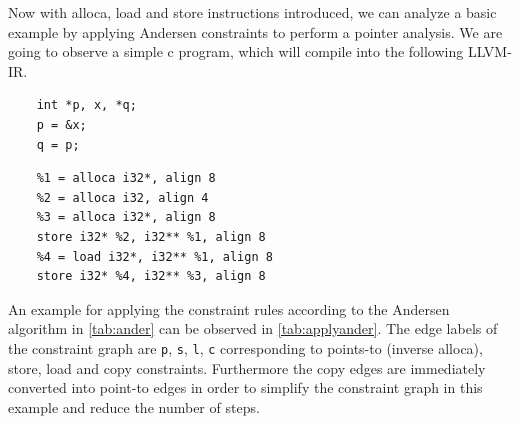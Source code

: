 Now with alloca, load and store instructions introduced, we can analyze a basic example by applying Andersen constraints to perform a pointer analysis.
We are going to observe a simple c program, which will compile into the following LLVM-IR.
\begin{center}
    \begin{minipage}[t]{0.3\textwidth}
        \begin{verbatim}
    int *p, x, *q;
    p = &x;
    q = p;
        \end{verbatim}
    \end{minipage}
    \begin{minipage}[t]{0.6\textwidth}
        \begin{verbatim}
    %1 = alloca i32*, align 8
    %2 = alloca i32, align 4
    %3 = alloca i32*, align 8
    store i32* %2, i32** %1, align 8
    %4 = load i32*, i32** %1, align 8
    store i32* %4, i32** %3, align 8
        \end{verbatim}
    \end{minipage}
\end{center}
An example for applying the constraint rules according to the Andersen algorithm in \autoref{tab:ander} can be observed in \autoref{tab:applyander}.
The edge labels of the constraint graph are \verb|p|, \verb|s|, \verb|l|, \verb|c| corresponding to points-to (inverse alloca), store, load and copy constraints.
Furthermore the copy edges are immediately converted into point-to edges in order to simplify the constraint graph in this example and reduce the number of steps.
